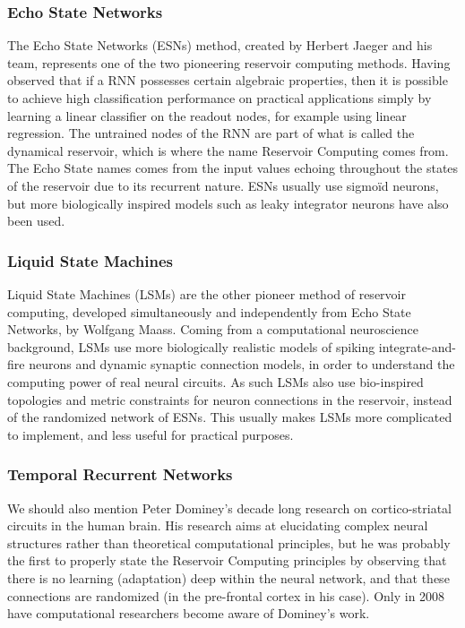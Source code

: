 \documentclass[12pt,oneside]{CUNY_CS_PhD}
\begin{document}
\subsubsection{Echo State Networks}
The Echo State Networks (ESNs) method, created by Herbert Jaeger and his team, represents one of the two pioneering reservoir computing methods. Having observed that if a RNN possesses certain algebraic properties, then it is possible to achieve high classification performance on practical applications simply by learning a linear classifier on the readout nodes, for example using linear regression. The untrained nodes of the RNN are part of what is called the dynamical reservoir, which is where the name Reservoir Computing comes from. The Echo State names comes from the input values echoing throughout the states of the reservoir due to its recurrent nature. ESNs usually use sigmoïd neurons, but more biologically inspired models such as leaky integrator neurons have also been used.

\subsubsection{Liquid State Machines}
Liquid State Machines (LSMs) are the other pioneer method of reservoir computing, developed simultaneously and independently from Echo State Networks, by Wolfgang Maass. Coming from a computational neuroscience background, LSMs use more biologically realistic models of spiking integrate-and-fire neurons and dynamic synaptic connection models, in order to understand the computing power of real neural circuits. As such LSMs also use bio-inspired topologies and metric constraints for neuron connections in the reservoir, instead of the randomized network of ESNs. This usually makes LSMs more complicated to implement, and less useful for practical purposes.

\subsubsection{Temporal Recurrent Networks}
We should also mention Peter Dominey's decade long research on cortico-striatal circuits in the human brain. His research aims at elucidating complex neural structures rather than theoretical computational principles, but he was probably the first to properly state the Reservoir Computing principles by observing that there is no learning (adaptation) deep within the neural network, and that these connections are randomized (in the pre-frontal cortex in his case). Only in 2008 have computational researchers become aware of Dominey's work.
\end{document}
